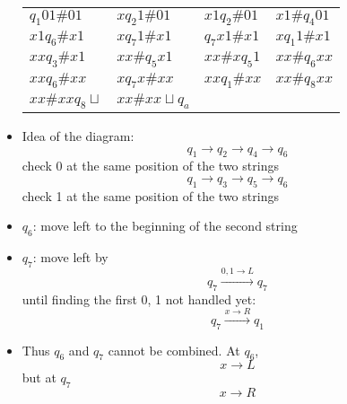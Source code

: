 \begin{frame}[allowframebreaks]
\begin{itemize}
\begin{center}
\begin{tabular}{llll}
  $q_1 0 1 \# 01$ & $x q_2 1 \# 01$ & $x1 q_2 \# 01$ & $x1\# q_4 01$
  \\
  $x1 q_6 \# x 1$ & $x q_7 1 \# x 1$ & $ q_7 x 1 \# x 1$ & $x q_1 1 \# x 1$
  \\
  $xx q_3 \# x 1$ & $xx \# q_5 x 1$ & $xx \# x q_5 1$ & $xx \# q_6 xx$ \\
  $xx q_6 \# xx$ & $x q_7 x \# xx$ & $xx q_1 \# xx$ & $xx \# q_8 xx$ \\
 $xx \# xx q_8 \sqcup$ &  $xx \# xx \sqcup q_a$ &&
\end{tabular}
\end{center}
\item Idea of the diagram:
  \begin{equation*}
    q_1 \rightarrow q_2 \rightarrow q_4 \rightarrow q_6
  \end{equation*}
  check 0 at the same position of the two strings
  \begin{equation*}
    q_1 \rightarrow q_3 \rightarrow q_5 \rightarrow q_6    
  \end{equation*}
  check 1
at the same position of the two strings
\item $q_6$: move left to the beginning of the second string
\item $q_7$: move left by
  \begin{equation*}
    q_7 \xrightarrow{0, 1 \rightarrow L} q_7
  \end{equation*}
until finding the first 0, 1 not handled yet:
\begin{equation*}
  q_7 \xrightarrow{x \rightarrow R} q_1
\end{equation*}
\item Thus $q_6$ and $q_7$ cannot be combined. At $q_6$,
  \begin{equation*}
    x \rightarrow L
  \end{equation*}
but at $q_7$
\begin{equation*}
  x \rightarrow R
\end{equation*}
\end{itemize}

\end{frame}

